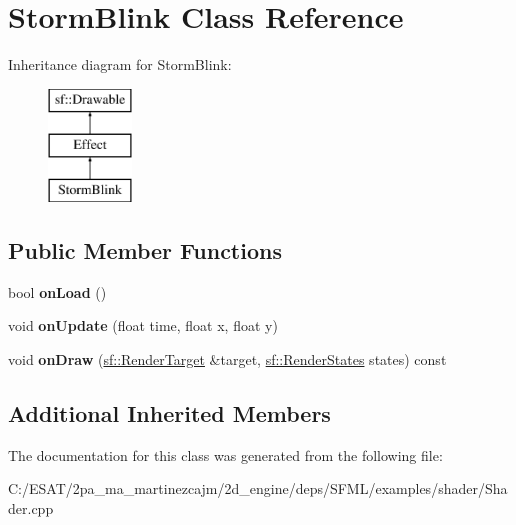 \hypertarget{class_storm_blink}{}\section{Storm\+Blink Class Reference}
\label{class_storm_blink}
Inheritance diagram for Storm\+Blink\+:\begin{figure}[H]
\begin{center}
\leavevmode
\includegraphics[height=3.000000cm]{class_storm_blink}
\end{center}
\end{figure}
\subsection*{Public Member Functions}
\begin{DoxyCompactItemize}
\item 
\mbox{\label{class_storm_blink_aaf78eaf05b23742e6b5f5c471b790cbe}} 
bool {\bfseries on\+Load} ()
\item 
\mbox{\label{class_storm_blink_ab679ebd3ef1b7a1b8fbd579cd7c87fce}} 
void {\bfseries on\+Update} (float time, float x, float y)
\item 
\mbox{\label{class_storm_blink_a75b5ef78dd4855d858b5f7e4f5be1053}} 
void {\bfseries on\+Draw} (\hyperlink{classsf_1_1_render_target}{sf\+::\+Render\+Target} \&target, \hyperlink{classsf_1_1_render_states}{sf\+::\+Render\+States} states) const
\end{DoxyCompactItemize}
\subsection*{Additional Inherited Members}


The documentation for this class was generated from the following file\+:\begin{DoxyCompactItemize}
\item 
C\+:/\+E\+S\+A\+T/2pa\+\_\+ma\+\_\+martinezcajm/2d\+\_\+engine/deps/\+S\+F\+M\+L/examples/shader/Shader.\+cpp\end{DoxyCompactItemize}
